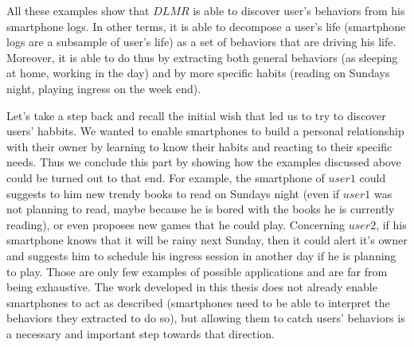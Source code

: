All these examples show that $DLMR$ is able to discover user's behaviors from his smartphone logs. In other terms, it is able to decompose a user's life (smartphone logs are a subsample of user's life) as a set of behaviors that are driving his life. Moreover, it is able to do thus by extracting both general behaviors (as sleeping at home, working in the day) and by more specific habits (reading on Sundays night, playing ingress on the week end). \par

Let's take a step back and recall the initial wish that led us to try to discover users' habbits. We wanted to enable smartphones to build a personal relationship with their owner by learning to know their habits and reacting to their specific needs. Thus we conclude this part by showing how the examples discussed above could be turned out to that end. For example, the smartphone of $user1$ could suggests to him new trendy books to read on Sundays night (even if $user1$ was not planning to read, maybe because he is bored with the books he is currently reading), or even proposes new games that he could play. Concerning $user2$, if his smartphone knows that it will be rainy next Sunday, then it could alert it's owner and suggests him to schedule his ingress session in another day if he is planning to play. Those are only few examples of possible applications and are far from being exhaustive. The work developed in this thesis does not already enable smartphones to act as described (smartphones need to be able to interpret the behaviors they extracted to do so), but allowing them to catch users' behaviors is a necessary and important step towards that direction.
